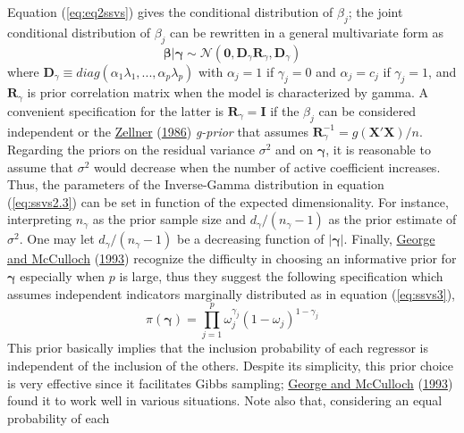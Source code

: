 \documentclass[
  12pt,
]{book}
\theoremstyle{break}
\theoremstyle{nonumberplain}
\begin{document}
Equation (\ref{eq:eq2ssvs}) gives the conditional distribution of
\(\beta_j\); the joint conditional distribution of \(\beta_j\) can be
rewritten in a general multivariate form as
\begin{equation*} \label{eq:ssvsmulti}
\boldsymbol{\beta}|\boldsymbol{\gamma}\sim\mathcal{N}(\boldsymbol{0},\boldsymbol{D}_{\gamma}\boldsymbol{R}_{\gamma},\boldsymbol{D}_{\gamma})
\end{equation*} where
\(\boldsymbol{D}_{\gamma} \equiv diag(\alpha_{1}\lambda_{1},...,\alpha_{p}\lambda_{p})\)
with \(\alpha_{j}=1\) if \(\gamma_{j}=0\) and \(\alpha_{j}=c_{j}\) if
\(\gamma_{j}=1\), and \(\boldsymbol{R}_{\gamma}\) is prior correlation
matrix when the model is characterized by gamma. A convenient
specification for the latter is
\(\boldsymbol{R}_{\gamma}=\boldsymbol{I}\) if the \(\beta_j\) can be
considered independent or the
\protect\hyperlink{ref-zellner_1986}{Zellner}
(\protect\hyperlink{ref-zellner_1986}{1986}) \emph{g-prior} that assumes
\(\boldsymbol{R}_{\gamma}^{-1}=g(\boldsymbol{X}'\boldsymbol{X})/n\).
Regarding the priors on the residual variance \(\sigma^{2}\) and on
\(\boldsymbol{\gamma}\), it is reasonable to assume that \(\sigma^2\)
would decrease when the number of active coefficient increases. Thus,
the parameters of the Inverse-Gamma distribution in equation
(\ref{eq:ssvs2.3}) can be set in function of the expected
dimensionality. For instance, interpreting \(n_\gamma\) as the prior
sample size and \(d_\gamma/(n_\gamma-1)\) as the prior estimate of
\(\sigma^2\). One may let \(d_\gamma/(n_\gamma-1)\) be a decreasing
function of \(|\boldsymbol{\gamma}|\). Finally,
\protect\hyperlink{ref-GM_1993}{George and McCulloch}
(\protect\hyperlink{ref-GM_1993}{1993}) recognize the difficulty in
choosing an informative prior for \(\boldsymbol{\gamma}\) especially
when \(p\) is large, thus they suggest the following specification which
assumes independent indicators marginally distributed as in equation
(\ref{eq:ssvs3}), \begin{equation*}
\pi(\boldsymbol{\gamma})=\prod_{j=1}^{p}\omega_{j}^{\gamma_{j}}(1-\omega_{j})^{1-\gamma_{j}}
\end{equation*} This prior basically implies that the inclusion
probability of each regressor is independent of the inclusion of the
others. Despite its simplicity, this prior choice is very effective
since it facilitates Gibbs sampling;
\protect\hyperlink{ref-GM_1993}{George and McCulloch}
(\protect\hyperlink{ref-GM_1993}{1993}) found it to work well in various
situations. Note also that, considering an equal probability of each
\end{document}
